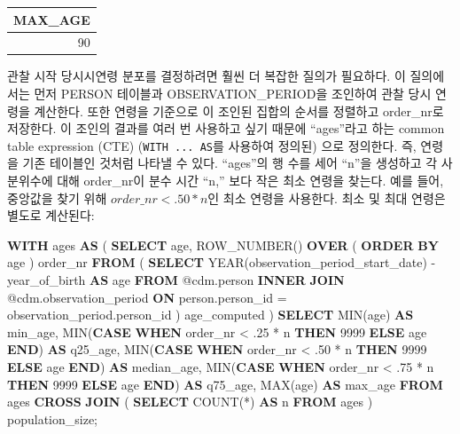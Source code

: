 \documentclass[11pt]{book}
\newenvironment{Shaded}{\begin{snugshade}}{\end{snugshade}}
\newcommand{\KeywordTok}[1]{\textcolor[rgb]{0.13,0.29,0.53}{\textbf{#1}}}
\newcommand{\DataTypeTok}[1]{\textcolor[rgb]{0.13,0.29,0.53}{#1}}
\newcommand{\DecValTok}[1]{\textcolor[rgb]{0.00,0.00,0.81}{#1}}
\newcommand{\FunctionTok}[1]{\textcolor[rgb]{0.00,0.00,0.00}{#1}}
\newcommand{\NormalTok}[1]{#1}
\theoremstyle{definition}
\theoremstyle{definition}
\theoremstyle{definition}
\theoremstyle{remark}
\begin{document}
\begin{longtable}[]{@{}r@{}}
\toprule
MAX\_AGE\tabularnewline
\midrule
\endhead
90\tabularnewline
\bottomrule
\end{longtable}

관찰 시작 당시시연령 분포를 결정하려면 훨씬 더 복잡한 질의가 필요하다.
이 질의에서는 먼저 PERSON 테이블과 OBSERVATION\_PERIOD을 조인하여 관찰
당시 연령을 계산한다. 또한 연령을 기준으로 이 조인된 집합의 순서를
정렬하고 order\_nr로 저장한다. 이 조인의 결과를 여러 번 사용하고 싶기
때문에 ``ages''라고 하는 common table expression (CTE)
(\texttt{WITH\ ...\ AS}를 사용하여 정의된) 으로 정의한다. 즉, 연령을
기존 테이블인 것처럼 나타낼 수 있다. ``ages''의 행 수를 세어 ``n''을
생성하고 각 사분위수에 대해 order\_nr이 분수 시간 ``n,'' 보다 작은 최소
연령을 찾는다. 예를 들어, 중앙값을 찾기 위해 \(order\_nr < .50 * n\)인
최소 연령을 사용한다. 최소 및 최대 연령은 별도로 계산된다:

\begin{Shaded}
\begin{Highlighting}[]
\KeywordTok{WITH}\NormalTok{ ages}
\KeywordTok{AS}\NormalTok{ (}
    \KeywordTok{SELECT}\NormalTok{ age,}
        \FunctionTok{ROW_NUMBER}\NormalTok{() }\KeywordTok{OVER}\NormalTok{ (}
            \KeywordTok{ORDER} \KeywordTok{BY}\NormalTok{ age}
\NormalTok{            ) order_nr}
    \KeywordTok{FROM}\NormalTok{ (}
        \KeywordTok{SELECT} \DataTypeTok{YEAR}\NormalTok{(observation_period_start_date) - year_of_birth }\KeywordTok{AS}\NormalTok{ age}
        \KeywordTok{FROM}\NormalTok{ @cdm.person}
        \KeywordTok{INNER} \KeywordTok{JOIN}\NormalTok{ @cdm.observation_period}
            \KeywordTok{ON}\NormalTok{ person.person_id = observation_period.person_id}
\NormalTok{        ) age_computed}
\NormalTok{    )}
\KeywordTok{SELECT} \FunctionTok{MIN}\NormalTok{(age) }\KeywordTok{AS}\NormalTok{ min_age,}
    \FunctionTok{MIN}\NormalTok{(}\KeywordTok{CASE} 
            \KeywordTok{WHEN}\NormalTok{ order_nr < .}\DecValTok{25}\NormalTok{ * n}
                \KeywordTok{THEN} \DecValTok{9999}
            \KeywordTok{ELSE}\NormalTok{ age}
            \KeywordTok{END}\NormalTok{) }\KeywordTok{AS}\NormalTok{ q25_age,}
    \FunctionTok{MIN}\NormalTok{(}\KeywordTok{CASE} 
            \KeywordTok{WHEN}\NormalTok{ order_nr < .}\DecValTok{50}\NormalTok{ * n}
                \KeywordTok{THEN} \DecValTok{9999}
            \KeywordTok{ELSE}\NormalTok{ age}
            \KeywordTok{END}\NormalTok{) }\KeywordTok{AS}\NormalTok{ median_age,}
    \FunctionTok{MIN}\NormalTok{(}\KeywordTok{CASE} 
            \KeywordTok{WHEN}\NormalTok{ order_nr < .}\DecValTok{75}\NormalTok{ * n}
                \KeywordTok{THEN} \DecValTok{9999}
            \KeywordTok{ELSE}\NormalTok{ age}
            \KeywordTok{END}\NormalTok{) }\KeywordTok{AS}\NormalTok{ q75_age,}
    \FunctionTok{MAX}\NormalTok{(age) }\KeywordTok{AS}\NormalTok{ max_age}
\KeywordTok{FROM}\NormalTok{ ages}
\KeywordTok{CROSS} \KeywordTok{JOIN}\NormalTok{ (}
    \KeywordTok{SELECT} \FunctionTok{COUNT}\NormalTok{(*) }\KeywordTok{AS}\NormalTok{ n}
    \KeywordTok{FROM}\NormalTok{ ages}
\NormalTok{    ) population_size;}
\end{Highlighting}
\end{Shaded}
\end{document}
